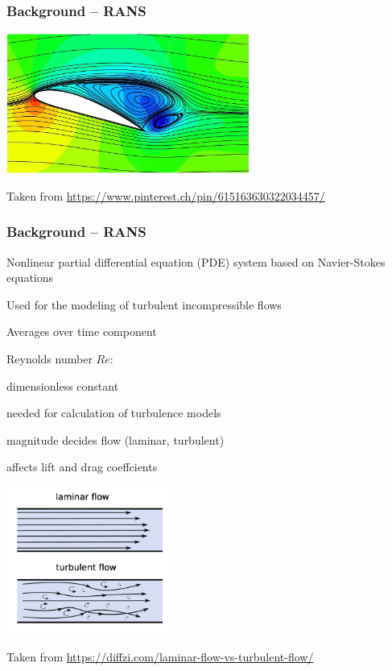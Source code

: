 \begin{frame}
    \frametitle{Background -- RANS}
	\vspace*{8mm}
\includegraphics[width=0.6\textwidth, height=.55\textheight]{./Ressourcen/Praesentation/Bilder/streamlines.jpg}

Taken from \url{https://www.pinterest.ch/pin/615163630322034457/}
\end{frame}
\clearpage

\begin{frame}
    \frametitle{Background -- RANS}
	\vspace*{8mm}
\begin{multicols}{2}
Nonlinear partial differential equation (PDE) system \newline
based on Navier-Stokes equations

Used for the modeling of turbulent incompressible flows

Averages over time component

Reynolds number $Re$:

\begin{PraesentationAufzaehlung}
		\item dimensionless constant
		\item needed for calculation of turbulence models
		\item magnitude decides flow (laminar, turbulent)
		\item  affects lift and drag coeffcients
\end{PraesentationAufzaehlung}

\vfill\columnbreak
\includegraphics[width=0.4\textwidth, height=.55\textheight]{./Ressourcen/Praesentation/Bilder/laminar_turbulent.png}

\end{multicols}
\vspace*{-4mm}
Taken from \url{https://diffzi.com/laminar-flow-vs-turbulent-flow/}
\end{frame}
\clearpage

